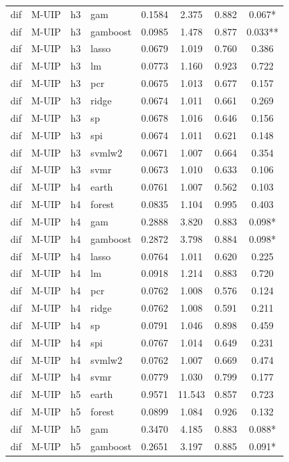 \begin{ThreePartTable}
\begin{longtable}[t]{llclcccc}
dif & M-UIP & h3 & gam & 0.1584 & 2.375 & 0.882 & 0.067*\\
dif & M-UIP & h3 & gamboost & 0.0985 & 1.478 & 0.877 & 0.033**\\
dif & M-UIP & h3 & lasso & 0.0679 & 1.019 & 0.760 & 0.386\\
dif & M-UIP & h3 & lm & 0.0773 & 1.160 & 0.923 & 0.722\\
dif & M-UIP & h3 & pcr & 0.0675 & 1.013 & 0.677 & 0.157\\
dif & M-UIP & h3 & ridge & 0.0674 & 1.011 & 0.661 & 0.269\\
dif & M-UIP & h3 & sp & 0.0678 & 1.016 & 0.646 & 0.156\\
dif & M-UIP & h3 & spi & 0.0674 & 1.011 & 0.621 & 0.148\\
dif & M-UIP & h3 & svmlw2 & 0.0671 & 1.007 & 0.664 & 0.354\\
dif & M-UIP & h3 & svmr & 0.0673 & 1.010 & 0.633 & 0.106\\
\addlinespace
dif & M-UIP & h4 & earth & 0.0761 & 1.007 & 0.562 & 0.103\\
dif & M-UIP & h4 & forest & 0.0835 & 1.104 & 0.995 & 0.403\\
dif & M-UIP & h4 & gam & 0.2888 & 3.820 & 0.883 & 0.098*\\
dif & M-UIP & h4 & gamboost & 0.2872 & 3.798 & 0.884 & 0.098*\\
dif & M-UIP & h4 & lasso & 0.0764 & 1.011 & 0.620 & 0.225\\
dif & M-UIP & h4 & lm & 0.0918 & 1.214 & 0.883 & 0.720\\
dif & M-UIP & h4 & pcr & 0.0762 & 1.008 & 0.576 & 0.124\\
dif & M-UIP & h4 & ridge & 0.0762 & 1.008 & 0.591 & 0.211\\
dif & M-UIP & h4 & sp & 0.0791 & 1.046 & 0.898 & 0.459\\
dif & M-UIP & h4 & spi & 0.0767 & 1.014 & 0.649 & 0.231\\
dif & M-UIP & h4 & svmlw2 & 0.0762 & 1.007 & 0.669 & 0.474\\
dif & M-UIP & h4 & svmr & 0.0779 & 1.030 & 0.799 & 0.177\\
\addlinespace
dif & M-UIP & h5 & earth & 0.9571 & 11.543 & 0.857 & 0.723\\
dif & M-UIP & h5 & forest & 0.0899 & 1.084 & 0.926 & 0.132\\
dif & M-UIP & h5 & gam & 0.3470 & 4.185 & 0.883 & 0.088*\\
dif & M-UIP & h5 & gamboost & 0.2651 & 3.197 & 0.885 & 0.091*\\

\end{longtable}
\end{ThreePartTable}
